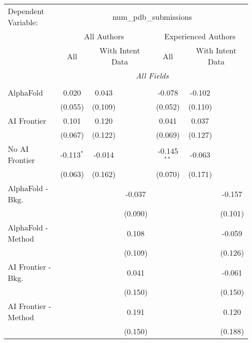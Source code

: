 \begingroup
\centering
\begin{tabular}{lcccccc}
   \tabularnewline \midrule \midrule
   Dependent Variable: & \multicolumn{6}{c}{num\_pdb\_submissions}\\
 & \multicolumn{3}{c}{All Authors} & \multicolumn{3}{c}{Experienced Authors} \\
\cmidrule(lr){2-4} \cmidrule(lr){5-7}
 & \multicolumn{1}{c}{All} & \multicolumn{2}{c}{With Intent Data} & \multicolumn{1}{c}{All} & \multicolumn{2}{c}{With Intent Data} \\
\cmidrule(lr){2-2} \cmidrule(lr){3-4} \cmidrule(lr){5-5} \cmidrule(lr){6-7}
 & \multicolumn{6}{c}{\textit{All Fields}} \\ \\
   AlphaFold               & 0.020        & 0.043   &         & -0.078        & -0.102  &   \\   
                           & (0.055)      & (0.109) &         & (0.052)       & (0.110) &   \\   
   AI Frontier             & 0.101        & 0.120   &         & 0.041         & 0.037   &   \\   
                           & (0.067)      & (0.122) &         & (0.069)       & (0.127) &   \\   
   No AI Frontier          & -0.113$^{*}$ & -0.014  &         & -0.145$^{**}$ & -0.063  &   \\   
                           & (0.063)      & (0.162) &         & (0.070)       & (0.171) &   \\   
   AlphaFold - Bkg.        &              &         & -0.037  &               &         & -0.157\\   
                           &              &         & (0.090) &               &         & (0.101)\\   
   AlphaFold - Method      &              &         & 0.108   &               &         & -0.059\\   
                           &              &         & (0.109) &               &         & (0.126)\\   
   AI Frontier - Bkg.      &              &         & 0.041   &               &         & -0.061\\   
                           &              &         & (0.150) &               &         & (0.150)\\   
   AI Frontier - Method    &              &         & 0.191   &               &         & 0.120\\   
                           &              &         & (0.150) &               &         & (0.188)\\   

\end{tabular}
